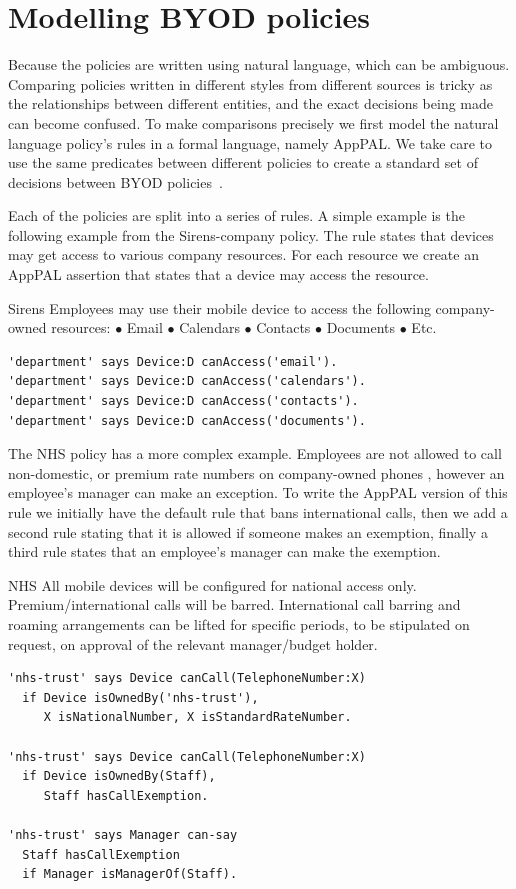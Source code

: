 \documentclass[thesis.tex]{subfiles}
\begin{document}
\section{Modelling BYOD policies}

Because the policies are written using natural language, which can be ambiguous.
Comparing policies written in different styles from different sources is tricky as the relationships between different entities, and the exact decisions being made can become confused.
To make comparisons precisely we first model the natural language policy's rules in a formal language, namely AppPAL.
We take care to use the same predicates between different policies to create a standard set of decisions between \ac{BYOD} policies~\cite{joseph_hallett_common_2017}.

Each of the policies are split into a series of rules. A simple example is the
following example from the Sirens-company policy. The rule states that devices
may get access to various company resources.
For each resource we create an AppPAL
assertion that states that a device may access the resource.

\begin{policyrule}{Sirens}
  Employees may use their mobile device to access the following company-owned resources:
  \newline $\bullet$ Email $\bullet$ Calendars $\bullet$ Contacts $\bullet$ Documents $\bullet$ Etc.
  \normalfont
  \begin{lstlisting}
'department' says Device:D canAccess('email').
'department' says Device:D canAccess('calendars').
'department' says Device:D canAccess('contacts').
'department' says Device:D canAccess('documents').
  \end{lstlisting}
\end{policyrule}

The NHS policy has a more complex example. Employees are not
allowed to call non-domestic, or premium rate numbers on company-owned
phones , however an employee's manager can make an exception.
To write the AppPAL version of this rule we initially have the default
rule that bans international calls, then we add a second rule stating that it is
allowed if someone makes an exemption, finally a third rule states that an employee's manager 
can make the exemption.

\begin{policyrule}{NHS}
  All mobile devices will be configured for national access only. Premium/international calls will be barred.
  International call barring and roaming arrangements can be lifted for specific periods, to be stipulated on request, on approval of the relevant manager/budget holder.
  \normalfont
  \begin{lstlisting}
'nhs-trust' says Device canCall(TelephoneNumber:X)
  if Device isOwnedBy('nhs-trust'),
     X isNationalNumber, X isStandardRateNumber.

'nhs-trust' says Device canCall(TelephoneNumber:X)
  if Device isOwnedBy(Staff),
     Staff hasCallExemption.

'nhs-trust' says Manager can-say
  Staff hasCallExemption
  if Manager isManagerOf(Staff).
  \end{lstlisting}
\end{policyrule}
\end{document}
